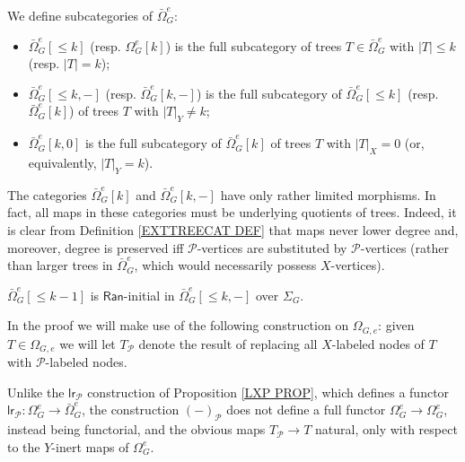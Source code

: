 \documentclass[a4paper,10pt]{article}%
\begin{document}
\begin{definition}
  \label{TREE_FILTRATION_PIECES_DEFINITION}
  We define subcategories of $\bar{\Omega}_{G}^e$:
  \begin{itemize}
  \item $\bar{\Omega}_G^e[\leq k]$ (resp. $\Omega_G^e[k]$) is the full subcategory of trees 
  $T \in \bar{\Omega}_G^e$ with $|T|\leq k$ (resp. $|T| = k$);
  \item $\bar{\Omega}_G^e[\leq k,-]$ (resp. $\bar{\Omega}_G^e[k,-]$) is the full subcategory of $\bar{\Omega}_G^e[\leq k]$ (resp. $\bar{\Omega}_G^e[k]$) of trees $T$ with $|T|_{Y}\neq k$;
  \item $\bar{\Omega}_G^e[k,0]$ is the full subcategory of 
  $\bar{\Omega}_G^e[k]$ of trees $T$ with $|T|_X = 0$ (or, equivalently, $|T|_{Y} = k$).
  \end{itemize}
\end{definition}


\begin{remark}\label{LIMMOR REM}
	The categories $\bar{\Omega}_G^e[k]$ and $\bar{\Omega}_G^e[k,-]$ have only rather limited morphisms.
	In fact, all maps in these categories must be underlying quotients of trees. Indeed, it is clear from Definition \ref{EXTTREECAT DEF} that maps never lower degree and, moreover, degree is preserved iff $\mathcal{P}$-vertices are substituted by $\mathcal{P}$-vertices (rather than larger trees in $\bar{\Omega}_G^e$, which would necessarily possess $X$-vertices).
\end{remark}


\begin{lemma}\label{MINUS_LAN_FINAL_LEMMA}
  $\bar{\Omega}_G^e[\leq k-1]$ is $\mathsf{Ran}$-initial in $\bar{\Omega}_G^{e}[\leq k,-]$ over $\Sigma_G$.
\end{lemma}

In the proof we will make use of the following construction on 
$\Omega_{G,e}$: given $T \in \Omega_{G,e}$ we will let $T_{\mathcal{P}}$ denote the result of replacing all $X$-labeled nodes of $T$ with $\mathcal{P}$-labeled nodes.

\begin{remark}\label{YINERT REM}
	Unlike the $\mathsf{lr}_{\mathcal{P}}$ construction of Proposition \ref{LXP PROP}, which defines a functor 
	$\mathsf{lr}_{\mathcal{P}} \colon
	\Omega_G^e \to \bar{\Omega}_G^e $,
	the construction 
	$(\minus)_{\mathcal{P}}$ does not define a full functor
	$\Omega_G^e \to \Omega_G^e$, instead being functorial, and the obvious maps $T_{\mathcal{P}} \to T$ natural, only with respect to the $Y$-inert maps of $\Omega_G^e$.
\end{remark}
\end{document}
